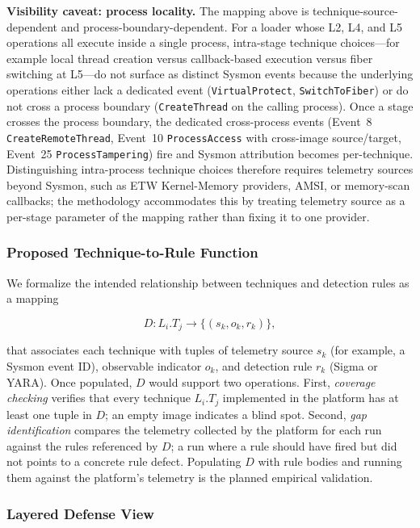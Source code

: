 \textbf{Visibility caveat: process locality.}
The mapping above is technique-source-dependent and process-boundary-dependent.
For a loader whose L2, L4, and L5 operations all execute inside a single process, intra-stage technique choices---for example local thread creation versus callback-based execution versus fiber switching at L5---do not surface as distinct Sysmon events because the underlying operations either lack a dedicated event (\texttt{VirtualProtect}, \texttt{SwitchToFiber}) or do not cross a process boundary (\texttt{CreateThread} on the calling process).
Once a stage crosses the process boundary, the dedicated cross-process events (Event~8 \texttt{CreateRemoteThread}, Event~10 \texttt{ProcessAccess} with cross-image source/target, Event~25 \texttt{ProcessTampering}) fire and Sysmon attribution becomes per-technique.
Distinguishing intra-process technique choices therefore requires telemetry sources beyond Sysmon, such as ETW Kernel-Memory providers, AMSI, or memory-scan callbacks; the methodology accommodates this by treating telemetry source as a per-stage parameter of the mapping rather than fixing it to one provider.

\subsubsection{Proposed Technique-to-Rule Function}

We formalize the intended relationship between techniques and detection rules as a mapping

\begin{equation}
    D: L_i.T_j \rightarrow \{(s_k, o_k, r_k)\},
    \label{eq:detection_map}
\end{equation}

\noindent that associates each technique with tuples of telemetry source $s_k$ (for example, a Sysmon event ID), observable indicator $o_k$, and detection rule $r_k$ (Sigma or YARA).
Once populated, $D$ would support two operations.
First, \textit{coverage checking} verifies that every technique $L_i.T_j$ implemented in the platform has at least one tuple in $D$; an empty image indicates a blind spot.
Second, \textit{gap identification} compares the telemetry collected by the platform for each run against the rules referenced by $D$; a run where a rule should have fired but did not points to a concrete rule defect.
Populating $D$ with rule bodies and running them against the platform's telemetry is the planned empirical validation.

\subsubsection{Layered Defense View}

